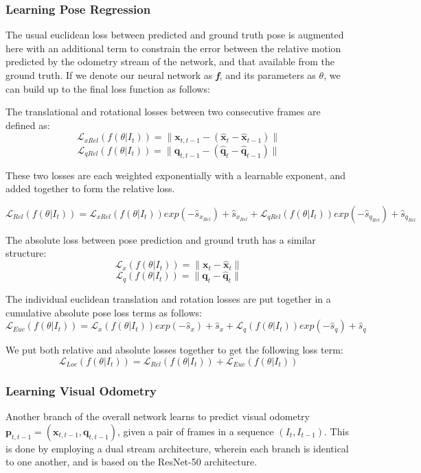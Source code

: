\subsubsection{Learning Pose Regression}
The usual euclidean loss between predicted and ground truth pose is augmented here with an additional term to constrain the error between the relative motion predicted
by the odometry stream of the network, and that available from the ground truth. If we denote our neural network as \textbf{\emph{f}}, and its parameters as $\theta$, we 
can build up to the final loss function as follows:

The translational and rotational losses between two consecutive frames are defined as:
\[\mathcal{L}_{xRel}(\mathbf{\mathit{f}}(\theta|\mathit{I}_t)) = \|\mathbf{x}_{t, t-1} - (\hat{\mathbf{x}}_t - \hat{\mathbf{x}}_{t-1})\|\]
\[\mathcal{L}_{qRel}(\mathbf{\mathit{f}}(\theta|\mathit{I}_t)) = \|\mathbf{q}_{t, t-1} - (\hat{\mathbf{q}}_t - \hat{\mathbf{q}}_{t-1})\|\]
 
These two losses are each weighted exponentially with a learnable exponent, and added together to form the relative loss.
 
\[ \mathcal{L}_{Rel}(\mathbf{\mathit{f}}(\theta|\mathit{I}_t)) = \mathcal{L}_{xRel}(\mathbf{\mathit{f}}(\theta|\mathit{I}_t))exp(-\hat{s}_{x_{Rel}}) + \hat{s}_{x_{Rel}}
+ \mathcal{L}_{qRel}(\mathbf{\mathit{f}}(\theta|\mathit{I}_t))exp(-\hat{s}_{q_{Rel}}) + \hat{s}_{q_{Rel}}\]
 
The absolute loss between pose prediction and ground truth has a similar structure:
\[\mathcal{L}_{x}(\mathbf{\mathit{f}}(\theta|\mathit{I}_t)) = \|\mathbf{x}_{t} - \hat{\mathbf{x}}_t\|\]
\[\mathcal{L}_{q}(\mathbf{\mathit{f}}(\theta|\mathit{I}_t)) = \|\mathbf{q}_{t} - \hat{\mathbf{q}}_t\|\]
 
The individual euclidean translation and rotation losses are put together in a cumulative absolute pose loss terms as follows:
\[ \mathcal{L}_{Euc}(\mathbf{\mathit{f}}(\theta|\mathit{I}_t)) = \mathcal{L}_{x}(\mathbf{\mathit{f}}(\theta|\mathit{I}_t))exp(-\hat{s}_{x}) + \hat{s}_{x}
+ \mathcal{L}_{q}(\mathbf{\mathit{f}}(\theta|\mathit{I}_t))exp(-\hat{s}_{q}) + \hat{s}_{q}\]

We put both relative and absolute losses together to get the following loss term:
\[\mathcal{L}_{Loc}(\mathbf{\mathit{f}}(\theta|\mathit{I}_t)) = \mathcal{L}_{Rel}(\mathbf{\mathit{f}}(\theta|\mathit{I}_t)) + \mathcal{L}_{Euc}(\mathbf{\mathit{f}}(\theta|\mathit{I}_t))\]

\subsubsection{Learning Visual Odometry}
Another branch of the overall network learns to predict visual odometry $\mathbf{p}_{t, t-1} = (\mathbf{x}_{t, t-1}, \mathbf{q}_{t, t-1})$, 
given a pair of frames in a sequence $(I_t, I_{t-1})$. This is done by employing a dual stream architecture, wherein each branch is identical to 
one another, and is based on the ResNet-50 architecture. 
 
